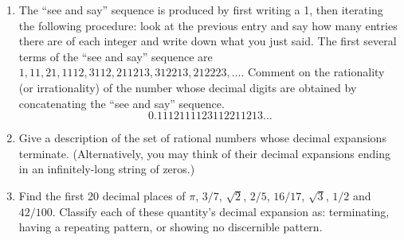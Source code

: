 \documentclass[10pt,]{book}
\theoremstyle{plain}
\theoremstyle{definition}
\theoremstyle{definition}
\numberwithin{equation}{section}
\newcommand{\hint}[1]{ }
\begin{document}
\begin{enumerate}[label=(\alph*)]
\item\hypertarget{li-9}{}
        The ``see and say'' sequence is produced by first writing a 1, 
        then iterating the following procedure:  look at the previous entry 
        and say how many entries there are of each integer and write down what 
        you just said.  The first several terms of the ``see and say'' sequence 
        are \(1, 11, 21, 1112, 3112, 211213, 312213, 212223, \ldots\).  Comment on the
        rationality (or irrationality) of the number whose decimal digits are obtained 
        by concatenating the ``see and say'' sequence.
        \begin{equation*}
          0.1112111123112211213...
        \end{equation*}
        \hint{
        Experiment!

        What would it mean for this number to be rational?  If we were to
        run into an element of the ``see and say'' sequence that is its own description, then
        from that point onward the sequence would get stuck repeating the same thing over and over
        (and the number whose digits are found by concatenating the elements of the ``see and say'' 
        sequence will enter into a repeating pattern.)
        }
\item\hypertarget{li-10}{}
        Give a description of the set of rational numbers whose decimal
        expansions terminate.  (Alternatively, you may think of their decimal
        expansions ending in an infinitely-long string of zeros.)

        \hint{If a decimal expansion terminates after, say, k digits, can you figure out how to produce an integer from that number? Think about multiplying by something \dots{}}
\item\hypertarget{li-11}{}
        Find the first 20 decimal places of \(\pi\), \(3/7\), \(\sqrt{2}\), 
          \(2/5\), \(16/17\), \(\sqrt{3}\), \(1/2\) and \(42/100\).  Classify each of
        these quantity's decimal expansion as: terminating, having a repeating
        pattern, or showing no discernible pattern.

        \hint{A calculator will generally be inadequate for this problem. You should try using a CAS (Computer Algebra System).  I  would recommend the Sage computer algebra system because
        like this book it is free \textemdash{} you can download sage and run it on your own system or you can try it out online without installing.  Check it out at www.sagemath.org.

}
\end{enumerate}
\end{document}
